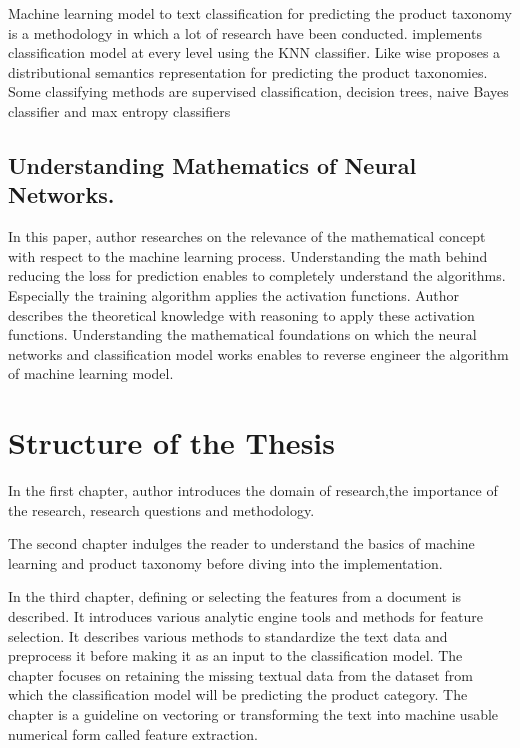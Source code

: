 Machine learning model to text classification for predicting the product taxonomy is a methodology in which a lot of research have been conducted. \cite{AliCevahir.} implements classification model at every level using the \acl*{KNN} classifier. Like wise \parencite{Gupta.20062016}  proposes a distributional semantics representation for predicting the product taxonomies.  Some classifying methods are supervised classification, decision trees, naive Bayes classifier and max entropy classifiers \parencite{BirdKleinLoper09}

\subsection{Understanding Mathematics of Neural Networks.}

In this paper, author researches on the relevance of the mathematical concept with respect to the machine learning process. Understanding the math behind reducing the loss for prediction enables to completely understand the algorithms. Especially the training algorithm applies the activation functions. Author describes the theoretical knowledge with reasoning to apply these activation functions. Understanding the mathematical foundations on which the neural networks and classification model works enables to reverse engineer the algorithm of machine learning model.

\clearpage

\section{Structure of the Thesis}

In the first chapter, author introduces the domain of research,the importance of the research, research questions and methodology.

The second chapter indulges the reader to understand the basics of machine learning and product taxonomy before diving into the implementation.

In the third chapter, defining or selecting the features from a document is described. It introduces various analytic engine tools and methods for feature selection. It describes various methods to standardize the text data and preprocess it before making it as an input to the classification model. The chapter focuses on retaining the missing textual data from the dataset from which the classification model will be predicting the product category. The chapter is a guideline on vectoring or transforming the text into machine usable numerical form called feature extraction.


